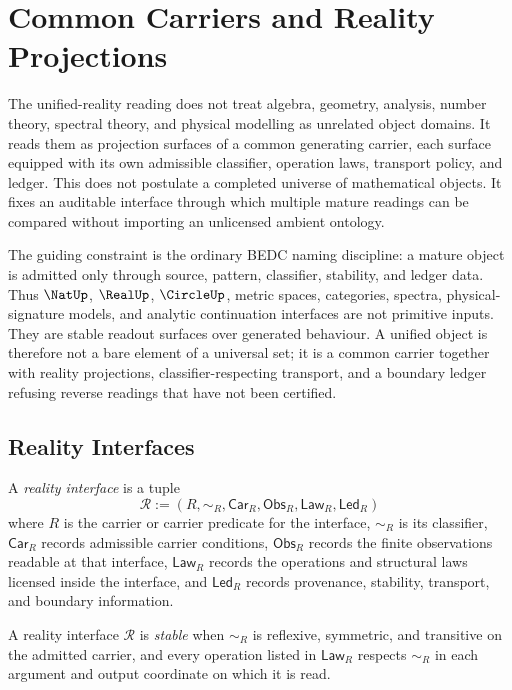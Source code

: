 \chapter{Common Carriers and Reality Projections}
\label{ch:visions-unified-reality-common-carrier-projection}

The unified-reality reading does not treat algebra, geometry, analysis,
number theory, spectral theory, and physical modelling as unrelated
object domains. It reads them as projection surfaces of a common
generating carrier, each surface equipped with its own admissible
classifier, operation laws, transport policy, and ledger. This does not
postulate a completed universe of mathematical objects. It fixes an
auditable interface through which multiple mature readings can be
compared without importing an unlicensed ambient ontology.

The guiding constraint is the ordinary BEDC naming discipline: a mature
object is admitted only through source, pattern, classifier, stability,
and ledger data. Thus $\NatUp$, $\RealUp$, $\CircleUp$, metric spaces,
categories, spectra, physical-signature models, and analytic
continuation interfaces are not primitive inputs. They are stable
readout surfaces over generated behaviour. A unified object is therefore
not a bare element of a universal set; it is a common carrier together
with reality projections, classifier-respecting transport, and a
boundary ledger refusing reverse readings that have not been certified.

\section{Reality Interfaces}
\label{sec:unified-reality-interfaces}

\begin{definition}
\label{def:unified-reality-interface}
A \emph{reality interface} is a tuple
$$
\mathcal R
:=
(R,\sim_R,\mathsf{Car}_R,\mathsf{Obs}_R,\mathsf{Law}_R,\mathsf{Led}_R)
$$
where $R$ is the carrier or carrier predicate for the interface,
$\sim_R$ is its classifier,
$\mathsf{Car}_R$ records admissible carrier conditions,
$\mathsf{Obs}_R$ records the finite observations readable at that
interface, $\mathsf{Law}_R$ records the operations and structural laws
licensed inside the interface, and $\mathsf{Led}_R$ records provenance,
stability, transport, and boundary information.
\end{definition}

\begin{definition}
\label{def:unified-reality-stable-interface}
A reality interface $\mathcal R$ is \emph{stable} when $\sim_R$ is
reflexive, symmetric, and transitive on the admitted carrier, and every
operation listed in $\mathsf{Law}_R$ respects $\sim_R$ in each argument
and output coordinate on which it is read.
\end{definition}

